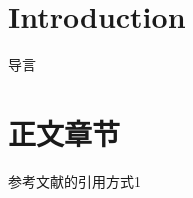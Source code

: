 \documentclass[10pt, oneside, a4paper]{article}      %
\newcommand{\upcite}[1]{\hspace{0ex}\textsuperscript{\cite{#1}}} %
\begin{document}
\newpage	        %
\thispagestyle{fancy}   %

\section{Introduction}
导言
\section{正文章节}
参考文献的引用方式1\upcite{QCQC_2014}



\end{document}
